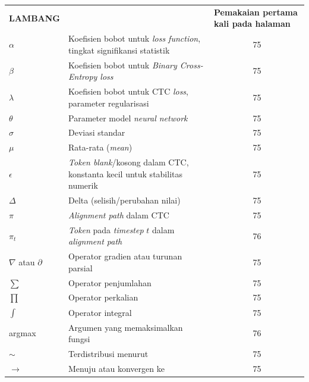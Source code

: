 \documentclass[12pt,a4paper]{article}
\begin{document}
\begin{longtable}{@{} l >{\raggedright\arraybackslash}p{6.5cm} c @{}}
\multicolumn{1}{l}{\textbf{LAMBANG}} & \multicolumn{1}{l}{\textbf{Nama}} & \multicolumn{1}{l}{\parbox[c]{3.5cm}{\raggedright \textbf{Pemakaian pertama kali pada halaman}}} \\



$\alpha$ & Koefisien bobot untuk \textit{loss function}, tingkat signifikansi statistik & 75 \\
$\beta$ & Koefisien bobot untuk \textit{Binary Cross-Entropy loss} & 75 \\
$\lambda$ & Koefisien bobot untuk CTC \textit{loss}, parameter regularisasi & 75 \\
$\theta$ & Parameter model \textit{neural network} & 75 \\
$\sigma$ & Deviasi standar & 75 \\
$\mu$ & Rata-rata (\textit{mean}) & 75 \\
$\epsilon$ & \textit{Token blank}/kosong dalam CTC, konstanta kecil untuk stabilitas numerik & 75 \\
$\Delta$ & Delta (selisih/perubahan nilai) & 75 \\
$\pi$ & \textit{Alignment path} dalam CTC & 75 \\
$\pi_t$ & \textit{Token} pada \textit{timestep} $t$ dalam \textit{alignment path} & 76 \\[1ex]


$\nabla$ atau $\partial$ & Operator gradien atau turunan parsial & 75 \\
$\sum$ & Operator penjumlahan & 75 \\
$\prod$ & Operator perkalian & 75 \\
$\int$ & Operator integral & 75 \\
argmax & Argumen yang memaksimalkan fungsi & 76 \\
$\sim$ & Terdistribusi menurut & 75 \\
$\to$ & Menuju atau konvergen ke & 75 \\[1ex]


\end{longtable}
\end{document}
